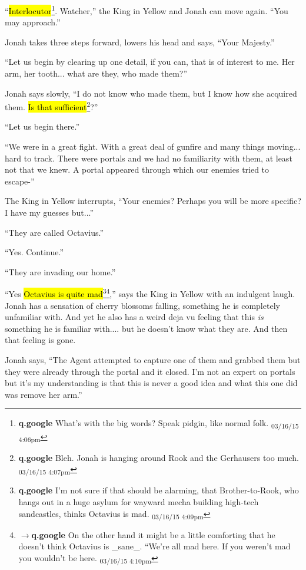 
``\hl{Interlocutor}\footnote{\textbf{q.google }What's with the big words?  Speak pidgin, like normal folk. \textsubscript{03/16/15 4:06pm}}.  Watcher,'' the King in Yellow and Jonah can move again.  ``You may approach.''

Jonah takes three steps forward, lowers his head and says, ``Your Majesty.''

``Let us begin by clearing up one detail, if you can, that is of interest to me.  Her arm, her tooth... what are they, who made them?''

Jonah says slowly, ``I do not know who made them, but I know how she acquired them.  \hl{Is that sufficient}\footnote{\textbf{q.google }Bleh.  Jonah is hanging around Rook and the Gerhausers too much. \textsubscript{03/16/15 4:07pm}}?''

``Let us begin there.''

``We were in a great fight.  With a great deal of gunfire and many things moving... hard to track.   There were portals and we had no familiarity with them, at least not that we knew.  A portal appeared through which our enemies tried to escape-''

The King in Yellow interrupts, ``Your enemies?  Perhaps you will be more specific?  I have my guesses but...''

``They are called Octavius.''

``Yes.  Continue.''

``They are invading our home.''

``Yes \hl{Octavius is quite mad}\footnote{\textbf{q.google }I'm not sure if that should be alarming, that Brother-to-Rook, who hangs out in a huge asylum for wayward mecha building high-tech sandcastles, thinks Octavius is mad. \textsubscript{03/16/15 4:09pm}}\footnote{$\rightarrow$\textbf{q.google }On the other hand it might be a little comforting that he doesn't think Octavius is \_sane\_.
``We're all mad here.  If you weren't mad you wouldn't be here. \textsubscript{03/16/15 4:10pm}},'' says the King in Yellow with an indulgent laugh.  Jonah has a sensation of cherry blossoms falling, something he is completely unfamiliar with.  And yet he also has a weird deja vu feeling that this \textit{is} something he is familiar with.... but he doesn't know what they are. And then that feeling is gone.

Jonah says, ``The Agent attempted to capture one of them and grabbed them but they were already through the portal and it closed.  I'm not an expert on portals but it's my understanding is that this is never a good idea and what this one did was remove her arm.''


